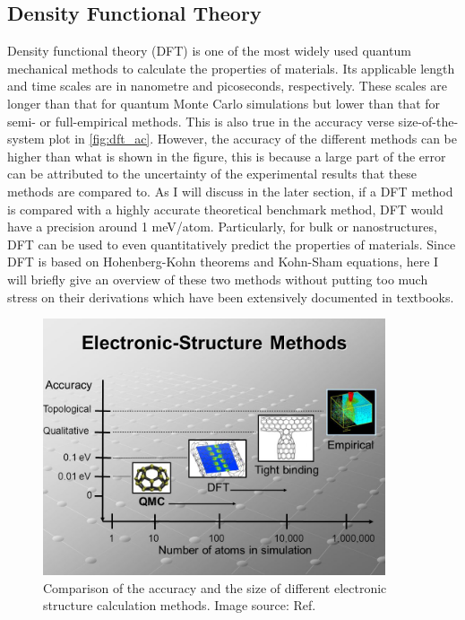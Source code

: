 \subsection{Density Functional Theory}
%
Density functional theory (DFT) is one of the most widely used quantum mechanical methods to calculate the properties of materials. Its applicable length and time scales are in nanometre and picoseconds, respectively. These scales are longer than that for quantum Monte Carlo simulations but lower than that for semi- or full-empirical methods. This is also true in the accuracy verse size-of-the-system plot in \autoref{fig:dft_ac}. However, the accuracy of the different methods can be higher than what is shown in the figure, this is because a large part of the error can be attributed to the uncertainty of the experimental results that these methods are compared to\cite{Kirklin2015}. As I will discuss in the later section, if a DFT method is compared with a highly accurate theoretical benchmark method, DFT would have a precision around 1 meV/atom. Particularly, for bulk or nanostructures, DFT can be used to even quantitatively predict the properties of materials. Since DFT is based on Hohenberg-Kohn theorems\cite{Hohenberg1964} and Kohn-Sham equations\cite{Kohn1965}, here I will briefly give an overview of these two methods without putting too much stress on their derivations which have been extensively documented in textbooks. 
%
\begin{figure}[htbp!] 
\centering  
\includegraphics[width=0.9\textwidth]{dft1.jpg}
\caption[Comparison of different electronic structure calculation methods]{ Comparison of the accuracy and the size of different electronic structure calculation methods. Image source: Ref. \cite{dft_ac}}  
\label{fig:dft_ac}
\end{figure} 
